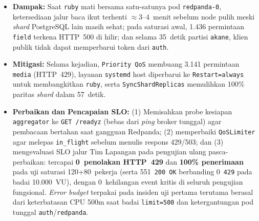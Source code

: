 \begin{enumerate}
\begin{itemize}
        \item \textbf{Dampak:} Saat \texttt{ruby} mati bersama satu-satunya pod \texttt{redpanda-0}, ketersediaan jalur baca ikut terhenti $\approx 3$--4~menit sebelum node pulih meski \textit{shard} PostgreSQL lain masih sehat; pada saturasi awal, 1.436 permintaan \texttt{field} terkena HTTP~500 di hilir; dan selama 35~detik partisi \texttt{akane}, klien publik tidak dapat memperbarui token dari \texttt{auth}.
        \item \textbf{Mitigasi:} Selama kejadian, \texttt{Priority QoS} membuang 3.141 permintaan \texttt{media} (HTTP~429), layanan \texttt{systemd} host diperbarui ke \texttt{Restart=always} untuk membangkitkan \texttt{ruby}, serta \texttt{SyncShardReplicas} memulihkan 100\% paritas \textit{shard} dalam 57~detik.
        \item \textbf{Perbaikan dan Pencapaian SLO:} (1) Memisahkan probe kesiapan \texttt{aggregator} ke \texttt{GET /readyz} (bebas dari \textit{ping} broker tunggal) agar pembacaan bertahan saat gangguan Redpanda; (2) memperbaiki \texttt{QoSLimiter} agar melepas \texttt{in\_flight} sebelum menulis respons 429/503; dan (3) mengevaluasi SLO jalur Tim Lapangan pada pengujian ulang pasca-perbaikan: tercapai \textbf{0~penolakan HTTP~429} dan \textbf{100\% penerimaan} pada uji saturasi 120+80~pekerja (serta 551~\texttt{200 OK} berbanding 0~\texttt{429} pada badai 10.000~VU), dengan 0~kehilangan event kritis di seluruh pengujian fungsional. \textit{Error budget} terpakai pada insiden uji pertama terutama berasal dari keterbatasan CPU 500m saat badai \texttt{limit=500} dan ketergantungan pod tunggal \texttt{auth}/\texttt{redpanda}.
    \end{itemize}
\end{enumerate}
